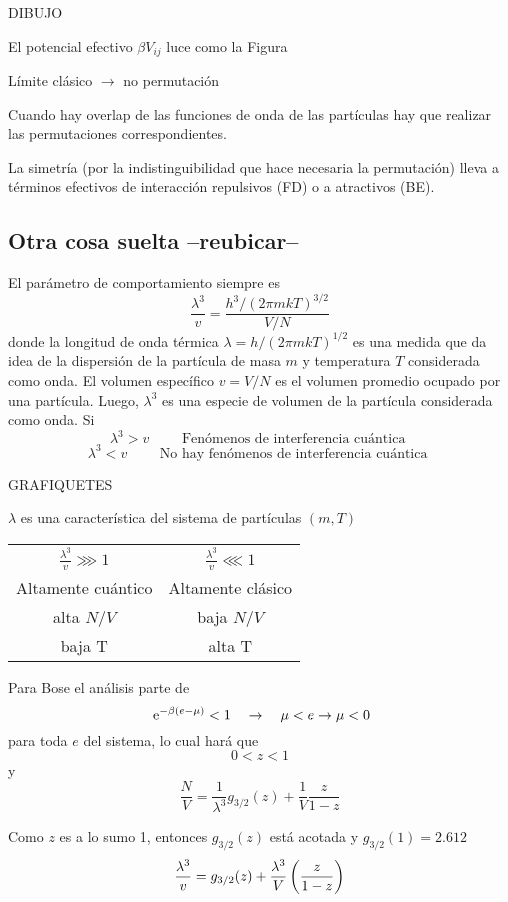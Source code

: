\documentclass[10pt,oneside]{CBFT_book}
\begin{document}
DIBUJO 

El potencial efectivo $\beta V_{ij}$ luce como la Figura


Límite clásico $\to$ no permutación 

Cuando hay overlap de las funciones de onda de las partículas hay que realizar las permutaciones correspondientes.

La simetría (por la indistinguibilidad que hace necesaria la permutación) lleva a términos efectivos de interacción 
repulsivos (FD) o a atractivos (BE).

\subsection{Otra cosa suelta --reubicar--}

El parámetro de comportamiento siempre es
\[
	\frac{\lambda^3}{v} = \frac{h^3/(2\pi m kT)^{3/2}}{V/N}
\]
donde la longitud de onda térmica $\lambda = h/(2\pi m kT)^{1/2}$ es una medida que da idea de la dispersión de la 
partícula de masa $m$ y temperatura $T$ considerada como onda. El volumen específico $v=V/N$ es el volumen promedio 
ocupado por una partícula. Luego, $\lambda^3$ es una especie de volumen de la partícula considerada como onda.
Si 
\[
	\lambda^3 > v \qquad \text{ Fenómenos de interferencia cuántica }
\]
\[
	\lambda^3 < v \qquad \text{ No hay fenómenos de interferencia cuántica }
\]

GRAFIQUETES

$\lambda$ es una característica del sistema de partículas $(m,T)$
\begin{center}
\begin{tabular}{c c}
$\displaystyle \frac{\lambda^3}{v} \ggg 1 $ & $\displaystyle \frac{\lambda^3}{v} \lll 1 $ \\
Altamente cuántico &  Altamente clásico\\
alta $N/V$ & baja $N/V$\\
baja T & alta T
\end{tabular}
\end{center}

Para Bose el análisis parte de 
\[
	\:\mathrm{e}^{-\beta(e-\mu)} < 1 \quad \rightarrow \quad \mu < e \to \mu < 0
\]
para toda $e$ del sistema, lo cual hará que 
\[
	0 < z < 1 
\]
y
\[
	\frac{N}{V} = \frac{1}{\lambda^3} g_{3/2}(z) + \frac{1}{V} \frac{z}{1-z}
\]

Como $z$ es a lo sumo 1, entonces $g_{3/2}(z)$ está acotada y $g_{3/2}(1)=2.612$
\[
	\frac{\lambda^3}{v} = g_{3/2}(z) + \frac{\lambda^3}{V} \left( \frac{ z }{ 1-z } \right)
\]
\end{document}
